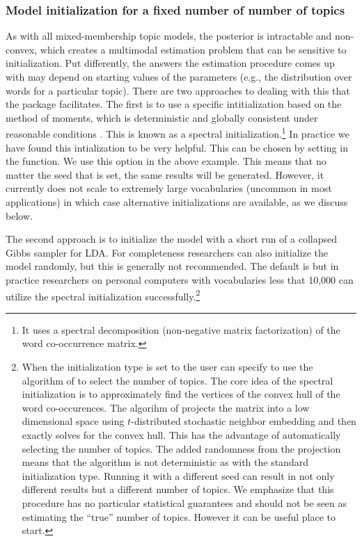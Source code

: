 \documentclass[article,shortnames]{jss}
\begin{document}
\subsubsection{Model initialization for a fixed number of number of topics}

As with all mixed-membership topic models, the posterior is intractable and non-convex, which creates a multimodal estimation problem that can be sensitive to initialization. Put differently, the answers the estimation procedure comes up with may depend on starting values of the parameters (e.g., the distribution over words for a particular topic). There are two approaches to dealing with this that the  package facilitates. The first is to use a specific intitialization based on the method of moments, which is deterministic and globally consistent under reasonable conditions \citep{chaptermulti}. This is known as a spectral initialization.\footnote{It uses a spectral decomposition (non-negative matrix factorization) of the word co-occurrence matrix.} In practice we have found this intialization to be very helpful. This can be chosen by setting  in the  function. We use this option in the above example. This means that no matter the seed that is set, the same results will be generated. However, it currently does not scale to extremely large vocabularies (uncommon in most applications) in which case alternative initializations are available, as we discuss below.

The second approach is to initialize the model with a short run of a collapsed Gibbs sampler for LDA. For completeness researchers can also initialize the model randomly, but this is generally not recommended. The default is  but in practice researchers on personal computers with vocabularies less that 10,000 can utilize the spectral initialization successfully.\footnote{When the initialization type is set to  the user can specify  to use the algorithm of \cite{lee2014low} to select the number of topics.  The core idea of the spectral initialization is to approximately find the vertices of the convex hull of the word co-occurences.  The algorihm of \cite{lee2014low} projects the matrix into a low dimensional space using $t$-distributed stochastic neighbor embedding \citep{van2014accelerating} and then exactly solves for the convex hull.  This has the advantage of automatically selecting the number of topics.  The added randomness from the projection means that the algorithm is not deterministic as with the standard  initialization type. Running it with a different seed can result in not only different results but a different number of topics.  We emphasize that this procedure has no particular statistical guarantees and should not be seen as estimating the ``true'' number of topics.  However it can be useful place to start.}
\end{document}
